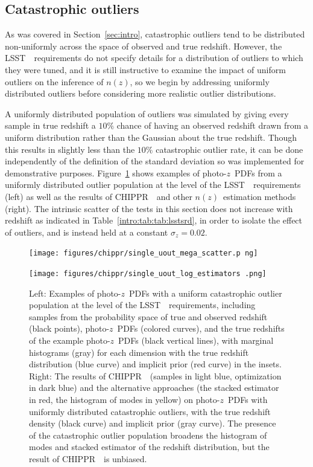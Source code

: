\documentclass[iop]{emulateapj}
\newcommand{\Sect}[1]{Section~\ref{#1}}
\newcommand{\Fig}[1]{Figure~\ref{#1}}
\newcommand{\project}[1]{{\textsc{#1}}~}
\newcommand{\lsst}{\project{LSST}}
\newcommand{\Chippr}{\project{CHIPPR}}
\newcommand{\nz}{$n(z)$}
\newcommand{\pz}{photo-$z$~}
\newcommand{\pzpdf}{\pz PDF}
\begin{document}
\subsection{Catastrophic outliers}
\label{sec:outliers}

As was covered in \Sect{sec:intro}, catastrophic outliers tend to be 
distributed non-uniformly across the space of observed and true redshift.
However, the \lsst\ requirements do not specify details for a distribution of 
outliers to which they were tuned, and it is still instructive to examine the 
impact of uniform outliers on the inference of \nz, so we begin by addressing 
uniformly distributed outliers before considering more realistic outlier 
distributions.

A uniformly distributed population of outliers was simulated by giving every 
sample in true redshift a $10\%$ chance of having an observed redshift drawn 
from a uniform distribution rather than the Gaussian about the true redshift.
Though this results in slightly less than the $10\%$ catastrophic outlier rate, 
it can be done independently of the definition of the standard deviation so was 
implemented for demonstrative purposes.
\Fig{fig:uniform-outliers} shows examples of \pzpdf s from a uniformly 
distributed outlier population at the level of the \lsst\ requirements (left) 
as well as the results of \Chippr\ and other \nz\ estimation methods (right).
The intrinsic scatter of the tests in this section does not increase with 
redshift as indicated in Table~\ref{intro:tab:tab:lsstsrd}, in order to isolate 
the effect of outliers, and is instead held at a constant $\sigma_{z} = 0.02$.

\begin{figure}
	
\texttt{[image: figures/chippr/single\_uout\_mega\_scatter.p
ng]}
	
\texttt{[image: figures/chippr/single\_uout\_log\_estimators
.png]}
	\caption{
		Left: Examples of \pzpdf s with a uniform catastrophic outlier 
population at the level of the \lsst\ requirements, including samples from the 
probability space of true and observed redshift (black points), \pzpdf s 
(colored curves), and the true redshifts of the example \pzpdf s (black 
vertical lines), with marginal histograms (gray) for each dimension with the 
true redshift distribution (blue curve) and implicit prior (red curve) in the 
insets.
		Right: The results of \Chippr\ (samples in light blue, 
optimization in dark blue) and the alternative approaches (the stacked 
estimator in red, the histogram of modes in yellow) on \pzpdf s with uniformly 
distributed catastrophic outliers, with the true redshift density (black curve) 
and implicit prior (gray curve).
		The presence of the catastrophic outlier population broadens 
the histogram of modes and stacked estimator of the redshift distribution, but 
the result of \Chippr\ is unbiased.
	}
	\label{fig:uniform-outliers}
\end{figure}
\end{document}
